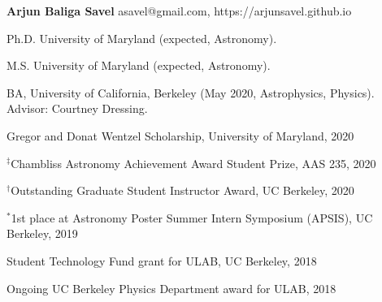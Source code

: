 \documentclass[12pt,letterpaper]{article}
\begin{document}
\thispagestyle{empty}\sloppy\sloppypar\raggedbottom

\textbf{\Large Arjun Baliga Savel} \hfill
\textsf{\small asavel@gmail.com, https://arjunsavel.github.io} \\

\begin{list}{}{\cvlist}
\item
Ph.D. University of Maryland (expected, Astronomy).
\item
M.S. University of Maryland (expected, Astronomy).
\item
BA, University of California, Berkeley (May 2020, Astrophysics, Physics). Advisor: Courtney Dressing.
\end{list}

\begin{list}{}{\cvlist}

\item Gregor and Donat Wentzel Scholarship, University of Maryland, 2020
\item $^\ddagger$Chambliss Astronomy Achievement Award Student Prize, AAS 235, 2020
\item $^\dagger$Outstanding Graduate Student Instructor Award, UC Berkeley, 2020
\item $^*$1st place at Astronomy Poster Summer Intern Symposium (APSIS), UC Berkeley, 2019
\item Student Technology Fund grant for ULAB, UC Berkeley, 2018
\item Ongoing UC Berkeley Physics Department award for ULAB, 2018

\end{list}


\ifdefined\withpubs
    

    \begin{list}{}{\cvlist}
    
    \end{list}

    \begin{list}{}{\cvlist}
    
    \end{list}
\fi
\end{document}
